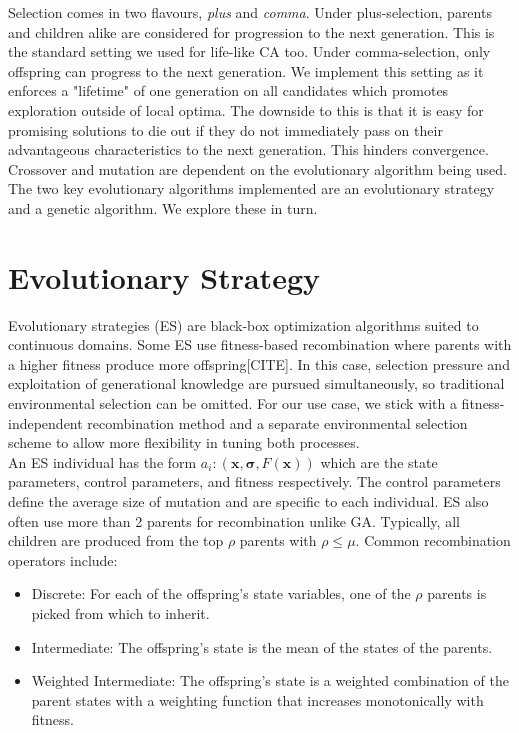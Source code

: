 Selection comes in two flavours, \textit{plus} and \textit{comma}. Under plus-selection, parents and children alike are considered for progression to the next generation. This is the standard setting we used for life-like CA too. Under comma-selection, only offspring can progress to the next generation. We implement this setting as it enforces a "lifetime" of one generation on all candidates which promotes exploration outside of local optima. The downside to this is that it is easy for promising solutions to die out if they do not immediately pass on their advantageous characteristics to the next generation. This hinders convergence.\\

Crossover and mutation are dependent on the evolutionary algorithm being used. The two key evolutionary algorithms implemented are an evolutionary strategy and a genetic algorithm. We explore these in turn.

\section{Evolutionary Strategy}
Evolutionary strategies (ES) are black-box optimization algorithms suited to continuous domains. Some ES use fitness-based recombination where parents with a higher fitness produce more offspring[CITE]. In this case, selection pressure and exploitation of generational knowledge are pursued simultaneously, so traditional environmental selection can be omitted. For our use case, we stick with a fitness-independent recombination method and a separate environmental selection scheme to allow more flexibility in tuning both processes.\\

An ES individual has the form $a_i: (\bm{x}, \bm{\sigma}, F(\bm{x}))$ which are the state parameters, control parameters, and fitness respectively. The control parameters define the average size of mutation and are specific to each individual. ES also often use more than 2 parents for recombination unlike GA. Typically, all children are produced from the top $\rho$ parents with $\rho \leq \mu$. Common recombination operators include:
\begin{itemize}
  \item Discrete: For each of the offspring's state variables, one of the $\rho$ parents is picked from which to inherit.
  \item Intermediate: The offspring's state is the mean of the states of the parents.
  \item Weighted Intermediate: The offspring's state is a weighted combination of the parent states with a weighting function that increases monotonically with fitness.
\end{itemize}

